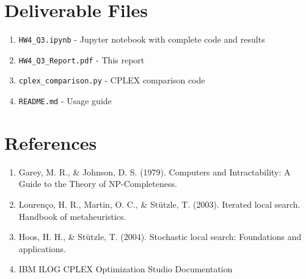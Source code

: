 \documentclass[12pt,a4paper]{article}
\begin{document}
\section{Deliverable Files}

\begin{enumerate}
    \item \texttt{HW4\_Q3.ipynb} - Jupyter notebook with complete code and results
    \item \texttt{HW4\_Q3\_Report.pdf} - This report
    \item \texttt{cplex\_comparison.py} - CPLEX comparison code
    \item \texttt{README.md} - Usage guide
\end{enumerate}

\section{References}

\begin{enumerate}
    \item Garey, M. R., \& Johnson, D. S. (1979). Computers and Intractability: A Guide to the Theory of NP-Completeness.
    \item Lourenço, H. R., Martin, O. C., \& Stützle, T. (2003). Iterated local search. Handbook of metaheuristics.
    \item Hoos, H. H., \& Stützle, T. (2004). Stochastic local search: Foundations and applications.
    \item IBM ILOG CPLEX Optimization Studio Documentation
\end{enumerate}
\end{document}
